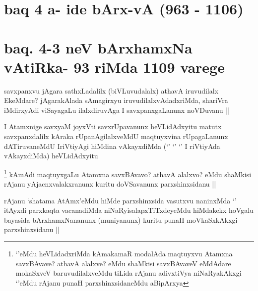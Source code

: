 \section*{baq 4 a- ide bArx-vA (963 - 1106)}

\section*{baq. 4-3 neV bArxhamxNa vAtiRka- 93 riMda 1109 varege}


\begin{artha}
savxpanxvu jAgara sathxLadalilx (biVLuvudalalx) athavA iruvudilalx EkeMdare? jAgarakAlada sAmagirxyu iruvudilalxvAdadxriMda, shariVra iMdirxyAdi viSayagaLu ilalxdiruvAga I savxpanxgaLanunx noVDuvanu ||
\end{artha}


\begin{artha}
I Atamxnige savxyaM joyxVti savxrUpavanunx heVLidAdxyitu matutx savxpanxdalilx kAraka rUpanAgilalxveMdU maqtuyxvina rUpagaLanunx dATiruvaneMdU IriVtiyAgi hiMdina vAkayxdiMda (`\stext' `\stext' `\stext' I riVtiyAda vAkayxdiMda) heVLidAdxyitu
\end{artha}


\begin{artha}
\footnote[1]{`\stext'eMdu heVLidadxriMda kAmakamaR modalAda maqtuyxvu Atamxna savxBAvave? athavA alalxve? eMdu shaMkisi savxBAvaveV eMdAdare mokaSxveV baruvudilalxveMdu tiLida rAjanu adivxtiVya niNaRyakAkxgi `\stext'eMdu rAjanu punaH parxshinxsidaneMdu aBipArxya}
kAmAdi maqtuyxgaLu Atamxna savxBAvavo? athavA alalxvo? eMdu shaMkisi rAjanu yAjacnxvalakxranunx kuritu doVSavanunx parxshinxsidanu ||
\end{artha}

\begin{artha}
rAjanu `shatama AtAmx'eMdu hiMde parxshinxsida vasutxvu naninxMda `\stext' itAyxdi parxkaqta vacanadiMda niNaRyisalapxTiTxdeyeMdu hiMdakekx hoVgalu bayasida bArxhamxNananunx (muniyanunx) kuritu punaH moVkaSxkAkxgi parxshinxsidanu ||
\end{artha}


